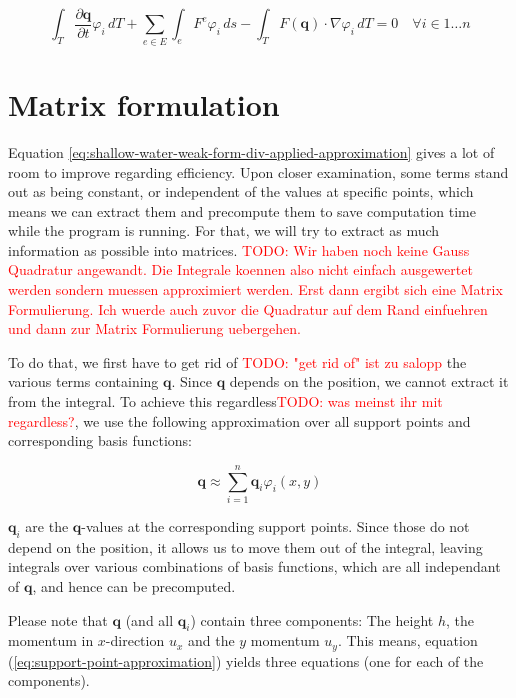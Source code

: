 \documentclass{article}
\newcommand{\todo}[2][]{\textcolor{red}{TODO\ifthenelse{\equal{#1}{}}{}{[#1]}: #2}}
\newcommand{\pd}[2]{\dfrac{\partial #1}{\partial #2}}
\renewcommand{\phi}{\varphi}
\begin{document}
\begin{equation}
  \label{eq:shallow-water-weak-form-div-applied-approximation}
  \int_T \pd {\mathbf{q}}{t} \phi_i \, dT +
  \sum_{e \in E} \int_{e} F^e \phi_i \, ds  -
  \int_T F(\mathbf{q}) \cdot \nabla \phi_i \, dT = 0
  \quad \forall i \in {1 \dots n}
\end{equation}

\section{Matrix formulation}
\label{sec:matrix-extraction}

Equation \ref{eq:shallow-water-weak-form-div-applied-approximation} gives a lot of room to improve regarding efficiency.
Upon closer examination, some terms stand out as being constant, or independent of the values at specific points, which means we can extract them and precompute them to save computation time while the program is running. For that, we will try to extract as much information as possible into matrices.
\todo{Wir haben noch keine Gauss Quadratur angewandt. Die Integrale koennen also nicht einfach ausgewertet werden sondern muessen approximiert werden. Erst dann ergibt sich eine Matrix Formulierung.
Ich wuerde auch zuvor die Quadratur auf dem Rand einfuehren und dann zur Matrix Formulierung uebergehen.
}

To do that, we first have to get rid of \todo{"get rid of" ist zu salopp} the various terms containing $\mathbf{q}$.
Since $\mathbf{q}$ depends on the position, we cannot extract it from the integral.
To achieve this regardless\todo{was meinst ihr mit regardless?}, we use the following approximation over all support points and corresponding basis functions:

\begin{equation}
  \label{eq:support-point-approximation}
  \mathbf{q} \approx \sum_{i=1}^n \mathbf{q}_i \phi_i\left(x,y\right)
\end{equation}

$\mathbf{q}_i$ are the $\mathbf{q}$-values at the corresponding support points.
Since those do not depend on the position, it allows us to move them out of the integral, leaving integrals over various combinations of basis functions, which are all independant of $\mathbf{q}$, and hence can be precomputed.

Please note that $\mathbf{q}$ (and all $\mathbf{q}_i$) contain three components: The height $h$, the momentum in $x$-direction $u_x$ and the $y$ momentum $u_y$. This means, equation (\ref{eq:support-point-approximation}) yields three equations (one for each of the components).
\end{document}
